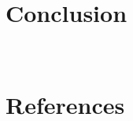 \documentclass[a4paper]{jpconf} %
\begin{document}
\section{Conclusion}
\label{ch:conclusion}
\\

% 

%  


\section*{References}
   
  
\end{document}
